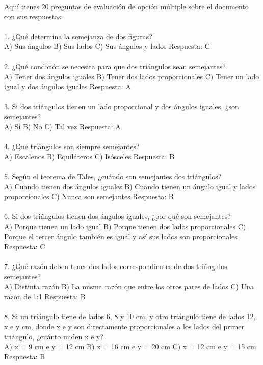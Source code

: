 \documentclass{article}
\begin{document}
Aquí tienes 20 preguntas de evaluación de opción múltiple sobre el documento con sus respuestas:\\
\\
1. ¿Qué determina la semejanza de dos figuras? \\
A) Sus ángulos  B) Sus lados   C) Sus ángulos y lados  Respuesta: C\\
\\
2. ¿Qué condición se necesita para que dos triángulos sean semejantes?\\
A) Tener dos ángulos iguales   B) Tener dos lados proporcionales    C) Tener un lado igual y dos ángulos iguales   Respuesta: A \\
\\
3. Si dos triángulos tienen un lado proporcional y dos ángulos iguales, ¿son semejantes?\\
A) Sí   B) No     C) Tal vez   Respuesta: A\\
\\
4. ¿Qué triángulos son siempre semejantes?\\
A) Escalenos  B) Equiláteros   C) Isósceles   Respuesta: B\\
\\
5. Según el teorema de Tales, ¿cuándo son semejantes dos triángulos?  \\
A) Cuando tienen dos ángulos iguales   B) Cuando tienen un ángulo igual y lados proporcionales  C) Nunca son semejantes    Respuesta: B\\
\\
6. Si dos triángulos tienen dos ángulos iguales, ¿por qué son semejantes?\\
A) Porque tienen un lado igual   B) Porque tienen dos lados proporcionales   C) Porque el tercer ángulo también es igual y así sus lados son proporcionales   Respuesta: C\\
\\
7. ¿Qué razón deben tener dos lados correspondientes de dos triángulos semejantes?\\
A) Distinta razón   B) La misma razón que entre los otros pares de lados   C) Una razón de 1:1   Respuesta: B\\
\\
8. Si un triángulo tiene de lados 6, 8 y 10 cm, y otro triángulo tiene de lados 12, x e y cm, donde x e y son directamente proporcionales a los lados del primer triángulo, ¿cuánto miden x e y?  \\
A) x = 9 cm e y = 12 cm   B) x = 16 cm e y = 20 cm    C) x = 12 cm e y = 15 cm   Respuesta: B \\
\end{document}
